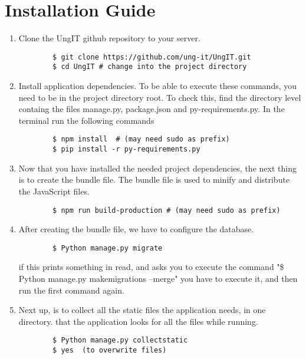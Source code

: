 \section{Installation Guide}
\begin{enumerate}
    \item Clone the UngIT github repository to your server.    
    \begin{lstlisting}
        $ git clone https://github.com/ung-it/UngIT.git
        $ cd UngIT # change into the project directory
    \end{lstlisting}
    
    \item Install application dependencies. To be able to execute these commands, you need to be in the project directory root. To check this, find the directory level containg the files manage.py, package.json and py-requirements.py. In the terminal run the following commands
    \begin{lstlisting}
        $ npm install  # (may need sudo as prefix)
        $ pip install -r py-requirements.py
    \end{lstlisting}
    
    \item Now that you have installed the needed project dependencies, the next thing is to create the bundle file. The bundle file is used to minify and distribute the JavaScript files.    
    \begin{lstlisting}
        $ npm run build-production # (may need sudo as prefix)
    \end{lstlisting}

    \item After creating the bundle file, we have to configure the database.
    \begin{lstlisting}
        $ Python manage.py migrate
    \end{lstlisting}
    
    if this prints something in read, and asks you to execute the command 
    "\$ Python manage.py makemigrations --merge"
    you have to execute it, and then run the first command again.   
    \item Next up, is to collect all the static files the application needs, in one directory. that the application looks for all the files while running.
    \begin{lstlisting}
        $ Python manage.py collectstatic
        $ yes  (to overwrite files)
    \end{lstlisting}
    

\end{enumerate}
